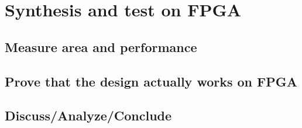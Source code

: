 \section{Synthesis and test on FPGA}
\subsection{Measure area and performance}
\subsection{Prove that the design actually works on FPGA}
\subsection{Discuss/Analyze/Conclude}